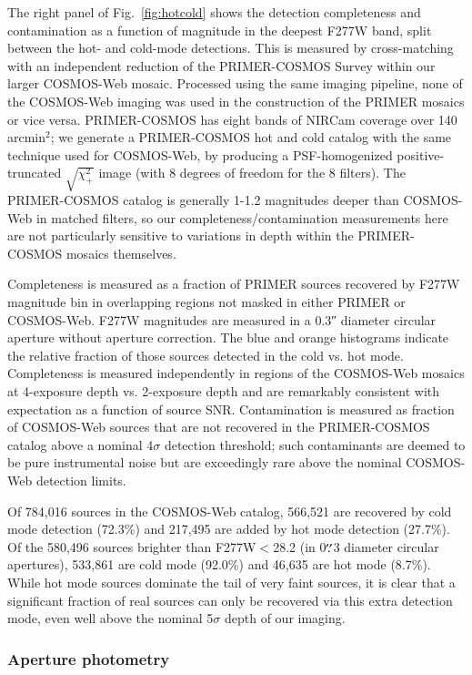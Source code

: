 \documentclass[longauth]{aa}
\begin{document}
The right panel of Fig.~\ref{fig:hotcold} shows the detection completeness and contamination as a function of magnitude in the deepest F277W band, split between the hot- and cold-mode detections. This is measured by cross-matching with an independent reduction of the PRIMER-COSMOS Survey \citep[GO\#1837]{PrimerDunlop2021} within our larger COSMOS-Web mosaic. Processed using the same imaging pipeline, none of the COSMOS-Web imaging was used in the construction of the PRIMER mosaics or vice versa.
PRIMER-COSMOS has eight bands of NIRCam coverage over 140\,arcmin$^2$; we generate a PRIMER-COSMOS hot and cold catalog with the same technique used for COSMOS-Web, by producing a PSF-homogenized positive-truncated $\sqrt{\chi^2_{+}}$ image (with 8 degrees of freedom for the 8 filters). The PRIMER-COSMOS catalog is generally 1-1.2 magnitudes deeper than COSMOS-Web in matched filters, so our completeness/contamination measurements here are not particularly sensitive to variations in depth within the PRIMER-COSMOS mosaics themselves.

Completeness is measured as a fraction of PRIMER sources recovered by F277W magnitude bin in overlapping regions not masked in either PRIMER or COSMOS-Web.
F277W magnitudes are measured in a \ang{;;0.3} diameter circular aperture without aperture correction.
The blue and orange histograms indicate the relative fraction of those sources detected in the cold vs. hot mode.
Completeness is measured independently in regions of the COSMOS-Web mosaics at 4-exposure depth vs. 2-exposure depth and are remarkably consistent with expectation as a function of source SNR.
Contamination is measured as fraction of COSMOS-Web sources that are not recovered in the PRIMER-COSMOS catalog above a nominal 4$\sigma$ detection threshold; such contaminants are deemed to be pure instrumental noise but are exceedingly rare above the nominal COSMOS-Web detection limits.

Of 784,016 sources in the COSMOS-Web catalog, 566,521 are recovered by cold mode detection (72.3\%) and 217,495 are added by hot mode detection (27.7\%).
Of the 580,496 sources brighter than F277W$<$28.2 (in 0$\overset{\prime\prime}{.}$3 diameter circular apertures), 533,861 are cold mode (92.0\%) and 46,635 are hot mode (8.7\%).  
While hot mode sources dominate the tail of very faint sources, it is clear that a significant fraction of real sources can only be recovered via this extra detection mode, even well above the nominal 5$\sigma$ depth of our imaging.

\subsubsection{Aperture photometry} \label{sec:hotcold-aperphoto}
\end{document}
